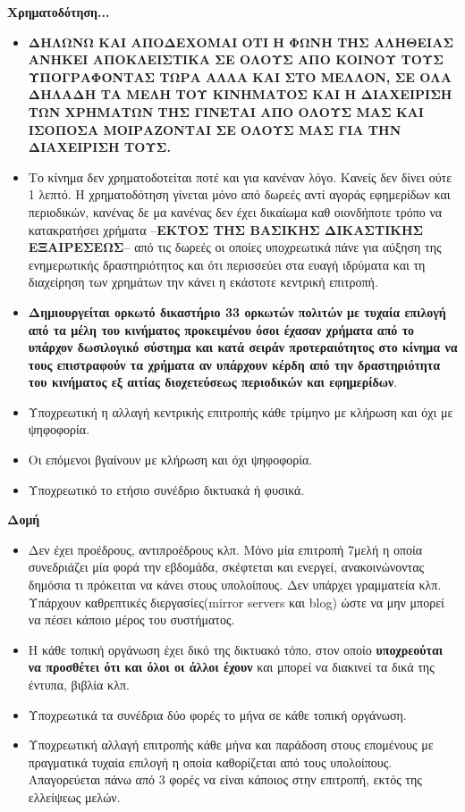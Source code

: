 \documentclass[a4paper]{article}
\begin{document}
\textbf{Χρηματοδότηση...}
\begin{itemize}
\item \textbf{ΔΗΛΩΝΩ ΚΑΙ ΑΠΟΔΕΧΟΜΑΙ ΟΤΙ Η ΦΩΝΗ ΤΗΣ ΑΛΗΘΕΙΑΣ ΑΝΗΚΕΙ ΑΠΟΚΛΕΙΣΤΙΚΑ ΣΕ ΟΛΟΥΣ ΑΠΟ ΚΟΙΝΟΥ ΤΟΥΣ ΥΠΟΓΡΑΦΟΝΤΑΣ ΤΩΡΑ ΑΛΛΑ ΚΑΙ ΣΤΟ ΜΕΛΛΟΝ, ΣΕ ΟΛΑ ΔΗΛΑΔΗ ΤΑ ΜΕΛΗ ΤΟΥ ΚΙΝΗΜΑΤΟΣ ΚΑΙ Η ΔΙΑΧΕΙΡΙΣΗ ΤΩΝ ΧΡΗΜΑΤΩΝ ΤΗΣ ΓΙΝΕΤΑΙ ΑΠΟ ΟΛΟΥΣ ΜΑΣ ΚΑΙ ΙΣΟΠΟΣΑ ΜΟΙΡΑΖΟΝΤΑΙ ΣΕ ΟΛΟΥΣ ΜΑΣ ΓΙΑ ΤΗΝ ΔΙΑΧΕΙΡΙΣΗ ΤΟΥΣ.}
\item Το κίνημα δεν χρηματοδοτείται ποτέ και για κανέναν λόγο. Κανείς δεν δίνει ούτε 1 λεπτό. Η χρηματοδότηση γίνεται μόνο από δωρεές αντί αγοράς εφημερίδων και περιοδικών, κανένας δε μα κανένας δεν έχει δικαίωμα καθ οιονδήποτε τρόπο να κατακρατήσει χρήματα --\textbf{ΕΚΤΟΣ ΤΗΣ ΒΑΣΙΚΗΣ ΔΙΚΑΣΤΙΚΗΣ ΕΞΑΙΡΕΣΕΩΣ}--  από τις δωρεές οι οποίες υποχρεωτικά πάνε για αύξηση της ενημερωτικής δραστηριότητος και ότι περισσεύει στα ευαγή ιδρύματα και τη διαχείρηση των χρημάτων την κάνει η εκάστοτε κεντρική επιτροπή.
\item \textbf{Δημιουργείται ορκωτό δικαστήριο 33 ορκωτών πολιτών με τυχαία επιλογή από τα μέλη του κινήματος προκειμένου όσοι έχασαν χρήματα από το υπάρχον δωσιλογικό σύστημα και κατά σειράν προτεραιότητος στο κίνημα να τους επιστραφούν τα χρήματα αν υπάρχουν κέρδη από την δραστηριότητα του κινήματος εξ αιτίας διοχετεύσεως περιοδικών και εφημερίδων}.
\item Υποχρεωτική η αλλαγή κεντρικής επιτροπής κάθε τρίμηνο με κλήρωση και όχι με ψηφοφορία.
\item Οι επόμενοι βγαίνουν με κλήρωση και όχι ψηφοφορία.
\item Υποχρεωτικό το ετήσιο συνέδριο δικτυακά ή φυσικά.
\end{itemize}

\textbf{Δομή}

\begin{itemize}
\item Δεν έχει προέδρους, αντιπροέδρους κλπ. Μόνο μία επιτροπή 7μελή η οποία συνεδριάζει μία φορά την εβδομάδα, σκέφτεται και ενεργεί, ανακοινώνοντας δημόσια τι πρόκειται να κάνει στους υπολοίπους. Δεν υπάρχει γραμματεία κλπ. Υπάρχουν καθρεπτικές διεργασίες(mirror servers και blog) ώστε να μην μπορεί να πέσει κάποιο μέρος του συστήματος. 
\item Η κάθε τοπική οργάνωση έχει δικό της δικτυακό τόπο, στον οποίο \textbf{υποχρεούται να προσθέτει ότι και όλοι οι άλλοι έχουν} και μπορεί να διακινεί τα δικά της έντυπα, βιβλία κλπ.
\item Υποχρεωτικά τα συνέδρια δύο φορές το μήνα σε κάθε τοπική οργάνωση.
\item Υποχρεωτική αλλαγή επιτροπής κάθε μήνα και παράδοση στους επομένους με πραγματικά τυχαία επιλογή η οποία καθορίζεται από τους υπολοίπους. Απαγορεύεται πάνω από 3 φορές να είναι κάποιος στην επιτροπή, εκτός της ελλείψεως μελών.
\end{itemize}
\end{document}
